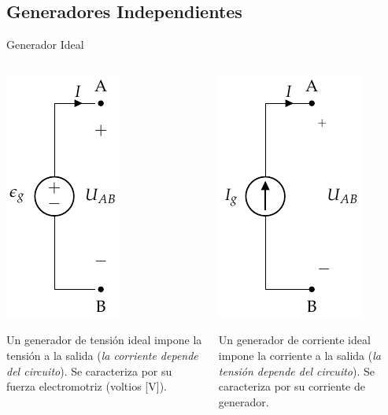 \documentclass[aspectratio=169, usenames,svgnames,dvipsnames]{beamer}
\begin{document}
\subsection{Generadores Independientes}
\label{sec:org8abf8c4}


\begin{frame}[label={sec:orga7913fc}]{Generador Ideal}
\begin{columns}
\begin{column}{0.5\columnwidth}
\begin{center}
\includegraphics[height=0.5\textheight]{../figs/FuenteTensionIdealDC.pdf}
\end{center}
Un \alert{generador de tensión ideal} impone la tensión a la salida (\emph{la corriente depende del circuito}). Se caracteriza por su \alert{fuerza electromotriz} (voltios [V]).
\end{column}
\begin{column}{0.5\columnwidth}
\begin{center}
\includegraphics[height=0.5\textheight]{../figs/FuenteCorrienteIdeal.pdf}
\end{center}
Un \alert{generador de corriente ideal} impone la corriente a la salida (\emph{la tensión depende del circuito}). Se caracteriza por su corriente de generador.
\end{column}
\end{columns}
\end{frame}
\end{document}
